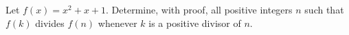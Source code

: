 Let $f(x)=x^2+x+1$. Determine, with proof, all positive integers $n$ such that $f(k)$ divides $f(n)$ whenever $k$ is a positive divisor of $n$.
